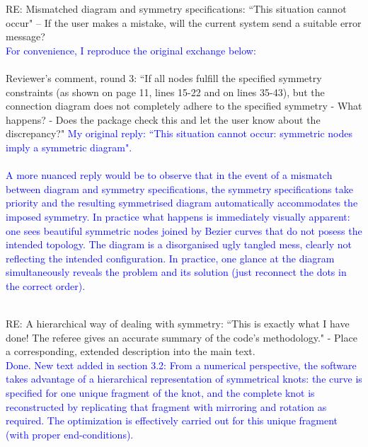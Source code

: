 \documentclass[12pt]{article}
\begin{document}
RE: Mismatched diagram and symmetry specifications: ``This situation
cannot occur" -- If the user makes a mistake, will the current system
send a suitable error message?\textcolor{blue}{\\For convenience, I
  reproduce the original exchange below:\\ \\} {\tiny Reviewer's
  comment, round 3: ``If all nodes fulfill the specified symmetry
  constraints (as shown on page 11, lines 15-22 and on lines 35-43),
  but the connection diagram does not completely adhere to the
  specified symmetry - What happens? - Does the package check this and
  let the user know about the discrepancy?"}  \textcolor{blue}{\tiny
  My original reply: ``This situation cannot occur: symmetric nodes
  imply a symmetric diagram".\\ \\} \textcolor{blue}{A more nuanced
  reply would be to observe that in the event of a mismatch between
  diagram and symmetry specifications, the symmetry specifications
  take priority and the resulting symmetrised diagram automatically
  accommodates the imposed symmetry.  In practice what happens is
  immediately visually apparent: one sees beautiful symmetric nodes
  joined by Bezier curves that do not posess the intended topology.
  The diagram is a disorganised ugly tangled mess, clearly not
  reflecting the intended configuration.  In practice, one glance at
  the diagram simultaneously reveals the problem and its solution
  (just reconnect the dots in the correct order).\\ \\}

RE: A hierarchical way of dealing with symmetry: ``This is exactly
what I have done!  The referee gives an accurate summary of the code's
methodology." - Place a corresponding, extended description into the
main text.\textcolor{blue}{\\Done.  New text added in section 3.2:
  From a numerical perspective, the software takes advantage of a
  hierarchical representation of symmetrical knots: the curve is
  specified for one unique fragment of the knot, and the complete knot
  is reconstructed by replicating that fragment with mirroring and
  rotation as required.  The optimization is effectively carried out
  for this unique fragment (with proper end-conditions).\\ \\}
\end{document}

